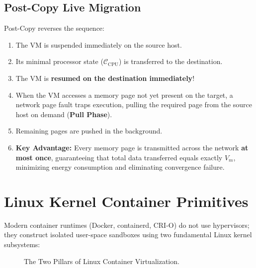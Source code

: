 \subsection{Post-Copy Live Migration}
Post-Copy reverses the sequence:
\begin{enumerate}[leftmargin=*]
  \item The VM is suspended immediately on the source host.
  \item Its minimal processor state ($\mathcal{C}_{\text{CPU}}$) is transferred to the destination.
  \item The VM is \textbf{resumed on the destination immediately}!
  \item When the VM accesses a memory page not yet present on the target, a network page fault traps execution, pulling the required page from the source host on demand (\textbf{Pull Phase}).
  \item Remaining pages are pushed in the background.
  \item \textbf{Key Advantage:} Every memory page is transmitted across the network \textbf{at most once}, guaranteeing that total data transferred equals exactly $V_m$, minimizing energy consumption and eliminating convergence failure.
\end{enumerate}

\section{Linux Kernel Container Primitives}
Modern container runtimes (Docker, containerd, CRI-O) do not use hypervisors; they construct isolated user-space sandboxes using two fundamental Linux kernel subsystems:

\begin{figure}[H]
\centering
{}
\caption{The Two Pillars of Linux Container Virtualization.}
\end{figure}

